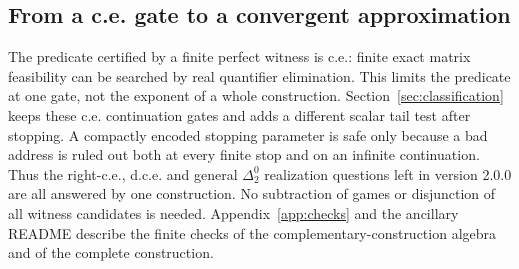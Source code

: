 \subsection{From a c.e. gate to a convergent approximation}
The predicate certified by a finite perfect witness is c.e.: finite exact matrix feasibility can be searched by real quantifier elimination. This limits the predicate at one gate, not the exponent of a whole construction. Section~\ref{sec:classification} keeps these c.e. continuation gates and adds a different scalar tail test after stopping. A compactly encoded stopping parameter is safe only because a bad address is ruled out both at every finite stop and on an infinite continuation. Thus the right-c.e., d.c.e. and general $\Delta^0_2$ realization questions left in version 2.0.0 are all answered by one construction. No subtraction of games or disjunction of all witness candidates is needed. Appendix~\ref{app:checks} and the ancillary README describe the finite checks of the complementary-construction algebra and of the complete construction.

